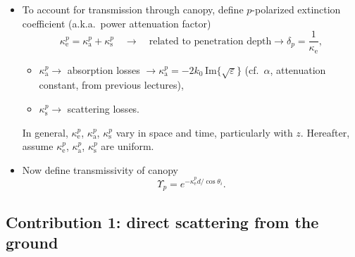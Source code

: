 \documentclass[11pt, oneside]{article}
\newcommand{\ke}[1]{\kappa_\mathrm{e}^{#1}}
\begin{document}
\begin{itemize}
	\item To account for transmission through canopy, define $p$-polarized extinction coefficient (a.k.a.\ power attenuation factor)
	\begin{equation}
		\label{e:ke}
		\ke{p} = \kappa_\mathrm{a}^p + \kappa_\mathrm{s}^p \quad\rightarrow\quad \text{related to penetration depth} \rightarrow \delta_p = \frac{1}{\kappa_\mathrm{e}},
	\end{equation}
	\begin{itemize}
		\item[] $\kappa_\mathrm{a}^p \rightarrow$ absorption losses $\rightarrow \kappa_\mathrm{a}^p = -2k_0\,\mathrm{Im}\{\sqrt{\varepsilon}\}$ (cf.\ $\alpha$, attenuation constant, from previous lectures),
		\item[] $\kappa_\mathrm{s}^p \rightarrow$ scattering losses.
	\end{itemize}
	In general, $\ke{p}$, $\kappa_\mathrm{a}^p$, $\kappa_\mathrm{s}^p$ vary in space and time, particularly with $z$. Hereafter, assume $\ke{p}$, $\kappa_\mathrm{a}^p$, $\kappa_\mathrm{s}^p$ are uniform.
	\item Now define transmissivity of canopy
	\begin{equation}
		\label{e:Ups}
		\Upsilon_p = e^{-\ke{p}d/\cos\theta_i}.
	\end{equation}
\end{itemize}

\subsection{Contribution 1: direct scattering from the ground}
\end{document}
